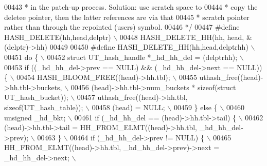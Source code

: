 \begin{DoxyCode}
{{{00443 \textcolor{comment}{ * in the patch-up process. Solution: use scratch space to}
00444 \textcolor{comment}{ * copy the deletee pointer, then the latter references are via that}
00445 \textcolor{comment}{ * scratch pointer rather than through the repointed (users) symbol.}
00446 \textcolor{comment}{ */}
00447 \textcolor{preprocessor}{#define HASH\_DELETE(hh,head,delptr)                                              \(\backslash\)}
00448 \textcolor{preprocessor}{    HASH\_DELETE\_HH(hh, head, &(delptr)->hh)}
00449 
00450 \textcolor{preprocessor}{#define HASH\_DELETE\_HH(hh,head,delptrhh)                                         \(\backslash\)}
00451 \textcolor{preprocessor}{do \{                                                                             \(\backslash\)}
00452 \textcolor{preprocessor}{  struct UT\_hash\_handle *\_hd\_hh\_del = (delptrhh);                                \(\backslash\)}
00453 \textcolor{preprocessor}{  if ((\_hd\_hh\_del->prev == NULL) && (\_hd\_hh\_del->next == NULL)) \{                \(\backslash\)}
00454 \textcolor{preprocessor}{    HASH\_BLOOM\_FREE((head)->hh.tbl);                                             \(\backslash\)}
00455 \textcolor{preprocessor}{    uthash\_free((head)->hh.tbl->buckets,                                         \(\backslash\)}
00456 \textcolor{preprocessor}{                (head)->hh.tbl->num\_buckets * sizeof(struct UT\_hash\_bucket));    \(\backslash\)}
00457 \textcolor{preprocessor}{    uthash\_free((head)->hh.tbl, sizeof(UT\_hash\_table));                          \(\backslash\)}
00458 \textcolor{preprocessor}{    (head) = NULL;                                                               \(\backslash\)}
00459 \textcolor{preprocessor}{  \} else \{                                                                       \(\backslash\)}
00460 \textcolor{preprocessor}{    unsigned \_hd\_bkt;                                                            \(\backslash\)}
00461 \textcolor{preprocessor}{    if (\_hd\_hh\_del == (head)->hh.tbl->tail) \{                                    \(\backslash\)}
00462 \textcolor{preprocessor}{      (head)->hh.tbl->tail = HH\_FROM\_ELMT((head)->hh.tbl, \_hd\_hh\_del->prev);     \(\backslash\)}
00463 \textcolor{preprocessor}{    \}                                                                            \(\backslash\)}
00464 \textcolor{preprocessor}{    if (\_hd\_hh\_del->prev != NULL) \{                                              \(\backslash\)}
00465 \textcolor{preprocessor}{      HH\_FROM\_ELMT((head)->hh.tbl, \_hd\_hh\_del->prev)->next = \_hd\_hh\_del->next;   \(\backslash\)}
}}}
\end{DoxyCode}
